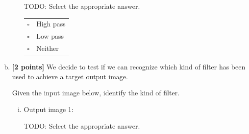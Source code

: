 \documentclass[11pt]{article}
\begin{document}
\begin{enumerate}[(a)]
\begin{enumerate}[(i)]
\begin{tcolorbox}[colback=white!5!white,colframe=green!75!black]
TODO: Select the appropriate answer. %

\begin{tabular}[h]{ll}
$\square$ & High pass \\
$\square$ & Low pass \\
$\square$ & Neither \\
\end{tabular}
\end{tcolorbox}
\end{enumerate}

\pagebreak

\item \textbf{[2 points]}
We decide to test if we can recognize which kind of filter has been used to achieve a target output image.

\begin{tcolorbox}[colback=orange!5!white,colframe=orange!75!black]
Given the input image below, identify the kind of filter.
\end{tcolorbox}


\begin{enumerate}[(i)]
\item
Output image 1:\\
\begin{tcolorbox}[colback=white!5!white,colframe=green!75!black]
TODO: Select the appropriate answer. %


\end{tcolorbox}
\end{enumerate}
\end{enumerate}
\end{document}
